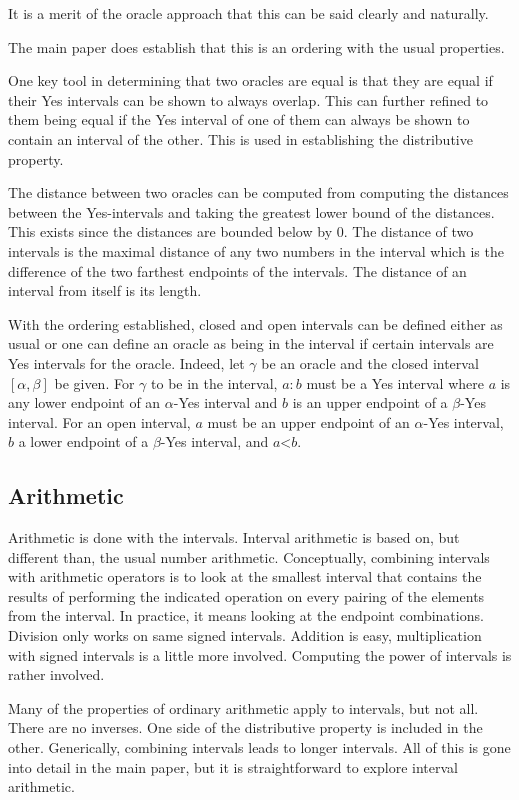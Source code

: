 \documentclass[12pt]{article}
\theoremstyle{remark}
\newcommand{\lt}{\mathord{<}}
\begin{document}
 It is a merit of the oracle approach that this can be said clearly and naturally. 

The main paper does establish that this is an ordering with the usual properties. 

One key tool in determining that two oracles are equal is that they are equal if their Yes intervals can be shown to always overlap. This can further refined to them being equal if the Yes interval of one of them can always be shown to contain an interval of the other. This is used in establishing the distributive property. 

The distance between two oracles can be computed from computing the distances between the Yes-intervals and taking the greatest lower bound of the distances. This exists since the distances are bounded below by 0. The distance of two intervals is the maximal distance of any two numbers in the interval which is the difference of the two farthest endpoints of the intervals. The distance of an interval from itself is its length. 

With the ordering established, closed and open intervals can be defined either as usual or one can define an oracle as being in the interval if certain intervals are Yes intervals for the oracle. Indeed, let $\gamma$ be an oracle and the closed interval $[\alpha, \beta]$ be given. For $\gamma$ to be in the interval, $a:b$ must be a Yes interval where $a$ is any lower endpoint of an $\alpha$-Yes interval and $b$ is an upper endpoint of a $\beta$-Yes interval. For an open interval, $a$ must be an upper endpoint of an $\alpha$-Yes interval, $b$ a lower endpoint of a $\beta$-Yes interval, and $a\lt b$. 

\subsection{Arithmetic}

Arithmetic is done with the intervals. Interval arithmetic is based on, but different than, the usual number arithmetic. Conceptually, combining intervals with arithmetic operators is to look at the smallest interval that contains the results of performing the indicated operation on every pairing of the elements from the interval. In practice, it means looking at the endpoint combinations. Division only works on same signed intervals. Addition is easy, multiplication with signed intervals is a little more involved. Computing the power of intervals is rather involved. 


Many of the properties of ordinary arithmetic apply to intervals, but not all. There are no inverses. One side of the distributive property is included in the other. Generically, combining intervals leads to longer intervals. All of this is gone into detail in the main paper, but it is straightforward to explore interval arithmetic. 
\end{document}
